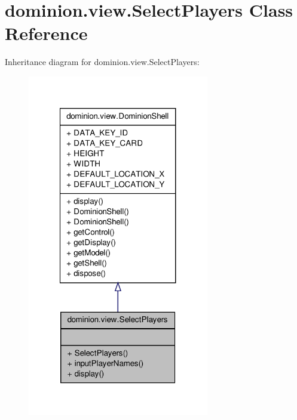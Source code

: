 \hypertarget{classdominion_1_1view_1_1SelectPlayers}{\section{dominion.\-view.\-Select\-Players \-Class \-Reference}
\label{classdominion_1_1view_1_1SelectPlayers}
}


\-Inheritance diagram for dominion.\-view.\-Select\-Players\-:
\nopagebreak
\begin{figure}[H]
\begin{center}
\leavevmode
\includegraphics[width=224pt]{classdominion_1_1view_1_1SelectPlayers__inherit__graph}
\end{center}
\end{figure}


